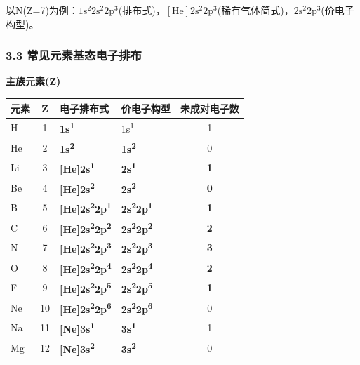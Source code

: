 以N(Z=7)为例：\(1\mathrm{s}^2 2\mathrm{s}^2 2\mathrm{p}^3\)(排布式)，\([\mathrm{He}] 2\mathrm{s}^2 2\mathrm{p}^3\)(稀有气体简式)，\(2\mathrm{s}^2 2\mathrm{p}^3\)(价电子构型)。

\subsubsection{3.3 常见元素基态电子排布}\label{ux5e38ux89c1ux5143ux7d20ux57faux6001ux7535ux5b50ux6392ux5e03}

\textbf{主族元素(Z)}

{\def\LTcaptype{none} %
\begin{longtable}[]{@{}lcllc@{}}
\toprule\noalign{}
元素 & Z & 电子排布式 & 价电子构型 & 未成对电子数 \\
\midrule\noalign{}
\endhead
\bottomrule\noalign{}
\endlastfoot
H & 1 & \textbf{1s\textsuperscript{1}} & 1s\textsuperscript{1} & 1 \\
He & 2 & \textbf{1s\textsuperscript{2}} & \textbf{1s\textsuperscript{2}} & 0 \\
Li & 3 & \textbf{{[}He{]}2s\textsuperscript{1}} & \textbf{2s\textsuperscript{1}} & \textbf{1} \\
Be & 4 & \textbf{{[}He{]}2s\textsuperscript{2}} & \textbf{2s\textsuperscript{2}} & \textbf{0} \\
B & 5 & \textbf{{[}He{]}2s\textsuperscript{2}2p\textsuperscript{1}} & \textbf{2s\textsuperscript{2}2p\textsuperscript{1}} & \textbf{1} \\
C & 6 & \textbf{{[}He{]}2s\textsuperscript{2}2p\textsuperscript{2}} & \textbf{2s\textsuperscript{2}2p\textsuperscript{2}} & \textbf{2} \\
N & 7 & \textbf{{[}He{]}2s\textsuperscript{2}2p\textsuperscript{3}} & \textbf{2s\textsuperscript{2}2p\textsuperscript{3}} & \textbf{3} \\
O & 8 & \textbf{{[}He{]}2s\textsuperscript{2}2p\textsuperscript{4}} & \textbf{2s\textsuperscript{2}2p\textsuperscript{4}} & \textbf{2} \\
F & 9 & \textbf{{[}He{]}2s\textsuperscript{2}2p\textsuperscript{5}} & \textbf{2s\textsuperscript{2}2p\textsuperscript{5}} & \textbf{1} \\
Ne & 10 & \textbf{{[}He{]}2s\textsuperscript{2}2p\textsuperscript{6}} & \textbf{2s\textsuperscript{2}2p\textsuperscript{6}} & 0 \\
Na & 11 & \textbf{{[}Ne{]}3s\textsuperscript{1}} & \textbf{3s\textsuperscript{1}} & 1 \\
Mg & 12 & \textbf{{[}Ne{]}3s\textsuperscript{2}} & \textbf{3s\textsuperscript{2}} & 0 \\

\end{longtable}}
